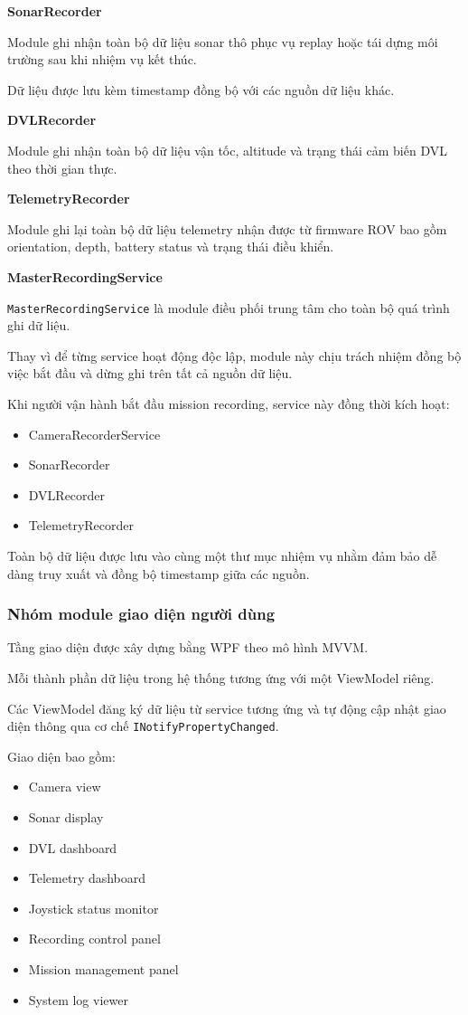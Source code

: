 \documentclass[../DoAn.tex]{subfiles}
\begin{document}
\subsubsubsection\textbf{SonarRecorder}

Module ghi nhận toàn bộ dữ liệu sonar thô phục vụ replay hoặc tái dựng
môi trường sau khi nhiệm vụ kết thúc.

Dữ liệu được lưu kèm timestamp đồng bộ với các nguồn dữ liệu khác.

\subsubsubsection\textbf{DVLRecorder}

Module ghi nhận toàn bộ dữ liệu vận tốc, altitude và trạng thái cảm biến
DVL theo thời gian thực.

\subsubsubsection\textbf{TelemetryRecorder}

Module ghi lại toàn bộ dữ liệu telemetry nhận được từ firmware ROV bao
gồm orientation, depth, battery status và trạng thái điều khiển.

\subsubsubsection\textbf{MasterRecordingService}

\texttt{MasterRecordingService} là module điều phối trung tâm cho toàn bộ
quá trình ghi dữ liệu.

Thay vì để từng service hoạt động độc lập, module này chịu trách nhiệm
đồng bộ việc bắt đầu và dừng ghi trên tất cả nguồn dữ liệu.

Khi người vận hành bắt đầu mission recording, service này đồng thời kích
hoạt:

\begin{itemize}
\item CameraRecorderService
\item SonarRecorder
\item DVLRecorder
\item TelemetryRecorder
\end{itemize}

Toàn bộ dữ liệu được lưu vào cùng một thư mục nhiệm vụ nhằm đảm bảo dễ
dàng truy xuất và đồng bộ timestamp giữa các nguồn.

\subsubsection{Nhóm module giao diện người dùng}

Tầng giao diện được xây dựng bằng WPF theo mô hình MVVM.

Mỗi thành phần dữ liệu trong hệ thống tương ứng với một ViewModel riêng.

Các ViewModel đăng ký dữ liệu từ service tương ứng và tự động cập nhật
giao diện thông qua cơ chế \texttt{INotifyPropertyChanged}.

Giao diện bao gồm:

\begin{itemize}
\item Camera view
\item Sonar display
\item DVL dashboard
\item Telemetry dashboard
\item Joystick status monitor
\item Recording control panel
\item Mission management panel
\item System log viewer
\end{itemize}
\end{document}
